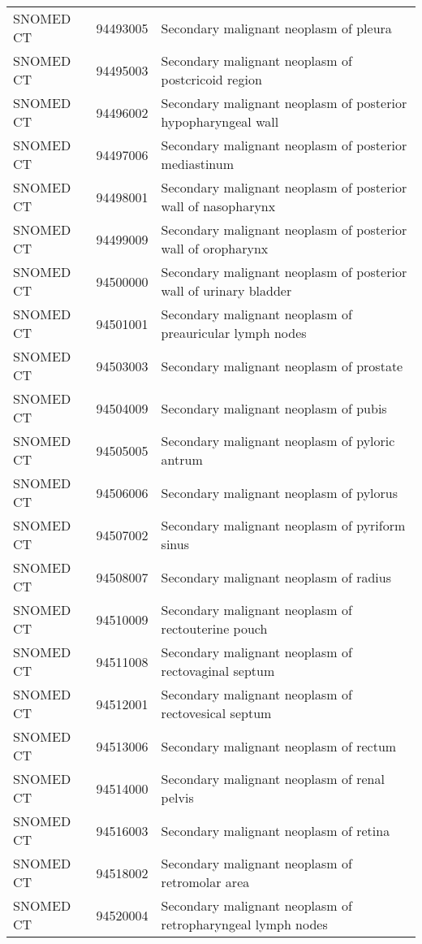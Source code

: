 \begin{longtable}{p{}p{}p{}}
  SNOMED CT & 94493005 & Secondary malignant neoplasm of pleura \\ 
  SNOMED CT & 94495003 & Secondary malignant neoplasm of postcricoid region \\ 
  SNOMED CT & 94496002 & Secondary malignant neoplasm of posterior hypopharyngeal wall \\ 
  SNOMED CT & 94497006 & Secondary malignant neoplasm of posterior mediastinum \\ 
  SNOMED CT & 94498001 & Secondary malignant neoplasm of posterior wall of nasopharynx \\ 
  SNOMED CT & 94499009 & Secondary malignant neoplasm of posterior wall of oropharynx \\ 
  SNOMED CT & 94500000 & Secondary malignant neoplasm of posterior wall of urinary bladder \\ 
  SNOMED CT & 94501001 & Secondary malignant neoplasm of preauricular lymph nodes \\ 
  SNOMED CT & 94503003 & Secondary malignant neoplasm of prostate \\ 
  SNOMED CT & 94504009 & Secondary malignant neoplasm of pubis \\ 
  SNOMED CT & 94505005 & Secondary malignant neoplasm of pyloric antrum \\ 
  SNOMED CT & 94506006 & Secondary malignant neoplasm of pylorus \\ 
  SNOMED CT & 94507002 & Secondary malignant neoplasm of pyriform sinus \\ 
  SNOMED CT & 94508007 & Secondary malignant neoplasm of radius \\ 
  SNOMED CT & 94510009 & Secondary malignant neoplasm of rectouterine pouch \\ 
  SNOMED CT & 94511008 & Secondary malignant neoplasm of rectovaginal septum \\ 
  SNOMED CT & 94512001 & Secondary malignant neoplasm of rectovesical septum \\ 
  SNOMED CT & 94513006 & Secondary malignant neoplasm of rectum \\ 
  SNOMED CT & 94514000 & Secondary malignant neoplasm of renal pelvis \\ 
  SNOMED CT & 94516003 & Secondary malignant neoplasm of retina \\ 
  SNOMED CT & 94518002 & Secondary malignant neoplasm of retromolar area \\ 
  SNOMED CT & 94520004 & Secondary malignant neoplasm of retropharyngeal lymph nodes \\ 

\end{longtable}

